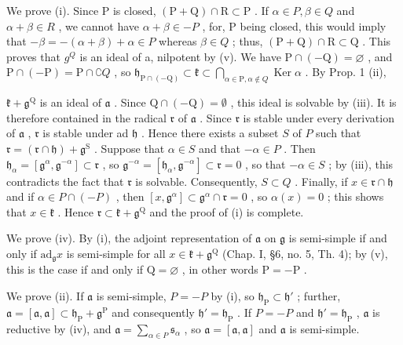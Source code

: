 We prove (i). Since P is closed, \((\mathrm{P} + \mathrm{Q}) \cap \mathrm{R} \subset \mathrm{P}\) . If \(\alpha \in P, \beta \in Q\) and \(\alpha + \beta \in R\) , we cannot have \(\alpha + \beta \in -P\) , for, P being closed, this would imply that \(-\beta = -(\alpha + \beta) + \alpha \in P\) whereas \(\beta \in Q\) ; thus, \((\mathrm{P} + \mathrm{Q}) \cap \mathrm{R} \subset \mathrm{Q}\) . This proves that \(g^{Q}\) is an ideal of a, nilpotent by (v). We have \(\mathrm{P} \cap (-\mathrm{Q}) = \varnothing\) , and \(\mathrm{P} \cap (-\mathrm{P}) = \mathrm{P} \cap \complement Q\) , so \(\mathfrak{h}_{\mathrm{P} \cap (-\mathrm{Q})} \subset \mathfrak{k} \subset \bigcap_{\alpha \in \mathrm{P}, \alpha \notin Q} \operatorname{Ker} \alpha\) . By Prop. 1 (ii),

\(\mathfrak{k} + \mathfrak{g}^{\mathrm{Q}}\) is an ideal of \(\mathfrak{a}\) . Since \(\mathrm{Q} \cap (-\mathrm{Q}) = \emptyset\) , this ideal is solvable by (iii). It is therefore contained in the radical \(\mathfrak{r}\) of \(\mathfrak{a}\) . Since \(\mathfrak{r}\) is stable under every derivation of \(\mathfrak{a}\) , \(\mathfrak{r}\) is stable under ad \(\mathfrak{h}\) . Hence there exists a subset \(S\) of \(P\) such that \(\mathfrak{r} = (\mathfrak{r} \cap \mathfrak{h}) + \mathfrak{g}^{\mathrm{S}}\) . Suppose that \(\alpha \in S\) and that \(-\alpha \in P\) . Then \(\mathfrak{h}_{\alpha} = [\mathfrak{g}^{\alpha}, \mathfrak{g}^{-\alpha}] \subset \mathfrak{r}\) , so \(\mathfrak{g}^{-\alpha} = [\mathfrak{h}_{\alpha}, \mathfrak{g}^{-\alpha}] \subset \mathfrak{r} = 0\) , so that \(-\alpha \in S\) ; by (iii), this contradicts the fact that \(\mathfrak{r}\) is solvable. Consequently, \(S \subset Q\) . Finally, if \(x \in \mathfrak{r} \cap \mathfrak{h}\) and if \(\alpha \in P \cap (-P)\) , then \([x, \mathfrak{g}^{\alpha}] \subset \mathfrak{g}^{\alpha} \cap \mathfrak{r} = 0\) , so \(\alpha(x) = 0\) ; this shows that \(x \in \mathfrak{k}\) . Hence \(\mathfrak{r} \subset \mathfrak{k} + \mathfrak{g}^{\mathrm{Q}}\) and the proof of (i) is complete.

We prove (iv). By (i), the adjoint representation of \(\mathfrak{a}\) on \(\mathfrak{g}\) is semi-simple if and only if \(\mathrm{ad}_{\mathfrak{g}}x\) is semi-simple for all \(x\in \mathfrak{k} + \mathfrak{g}^{\mathrm{Q}}\) (Chap. I, §6, no. 5, Th. 4); by (v), this is the case if and only if \(\mathrm{Q} = \varnothing\) , in other words \(\mathrm{P} = -\mathrm{P}\) .

We prove (ii). If \(\mathfrak{a}\) is semi-simple, \(P = -P\) by (i), so \(\mathfrak{h}_{\mathrm{P}} \subset \mathfrak{h}'\) ; further, \(\mathfrak{a} = [\mathfrak{a}, \mathfrak{a}] \subset \mathfrak{h}_{\mathrm{P}} + \mathfrak{g}^{\mathrm{P}}\) and consequently \(\mathfrak{h}' = \mathfrak{h}_{\mathrm{P}}\) . If \(P = -P\) and \(\mathfrak{h}' = \mathfrak{h}_{\mathrm{P}}\) , \(\mathfrak{a}\) is reductive by (iv), and \(\mathfrak{a} = \sum_{\alpha \in P} \mathfrak{s}_{\alpha}\) , so \(\mathfrak{a} = [\mathfrak{a}, \mathfrak{a}]\) and \(\mathfrak{a}\) is semi-simple.

